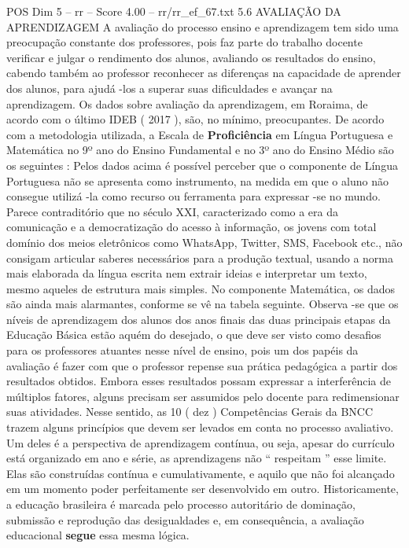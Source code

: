 \begin{textsample}{POS Dim 5 – rr – Score 4.00 – rr/rr\_ef\_67.txt}  \label{ex:f5_pos_229}
5.6 AVALIAÇÃO DA APRENDIZAGEM A avaliação do processo ensino e aprendizagem tem sido uma preocupação constante dos professores, pois faz parte do trabalho docente verificar e julgar o rendimento dos alunos, avaliando os resultados do ensino, cabendo também ao professor reconhecer as diferenças na capacidade de aprender dos alunos, para ajudá -los a superar suas dificuldades e avançar na aprendizagem.
Os dados sobre avaliação da aprendizagem, em Roraima, de acordo com o último IDEB ( 2017 ), são, no mínimo, preocupantes.
De acordo com a metodologia utilizada, a Escala de \textbf{Proficiência} em Língua Portuguesa e Matemática no 9º ano do Ensino Fundamental e no 3º ano do Ensino Médio são os seguintes : Pelos dados acima é possível perceber que o componente de Língua Portuguesa não se apresenta como instrumento, na medida em que o aluno não consegue utilizá -la como recurso ou ferramenta para expressar -se no mundo.
Parece contraditório que no século XXI, caracterizado como a era da comunicação e a democratização do acesso à informação, os jovens com total domínio dos meios eletrônicos como WhatsApp, Twitter, SMS, Facebook etc., não consigam articular saberes necessários para a produção textual, usando a norma mais elaborada da língua escrita nem extrair ideias e interpretar um texto, mesmo aqueles de estrutura mais simples.
No componente Matemática, os dados são ainda mais alarmantes, conforme se vê na tabela seguinte.
Observa -se que os níveis de aprendizagem dos alunos dos anos finais das duas principais etapas da Educação Básica estão aquém do desejado, o que deve ser visto como desafios para os professores atuantes nesse nível de ensino, pois um dos papéis da avaliação é fazer com que o professor repense sua prática pedagógica a partir dos resultados obtidos.
Embora esses resultados possam expressar a interferência de múltiplos fatores, alguns precisam ser assumidos pelo docente para redimensionar suas atividades.
Nesse sentido, as 10 ( dez ) Competências Gerais da BNCC trazem alguns princípios que devem ser levados em conta no processo avaliativo.
Um deles é a perspectiva de aprendizagem contínua, ou seja, apesar do currículo está organizado em ano e série, as aprendizagens não “ respeitam ” esse limite.
Elas são construídas contínua e cumulativamente, e aquilo que não foi alcançado em um momento poder perfeitamente ser desenvolvido em outro.
Historicamente, a educação brasileira é marcada pelo processo autoritário de dominação, submissão e reprodução das desigualdades e, em consequência, a avaliação educacional \textbf{segue} essa mesma lógica.

\end{textsample}
